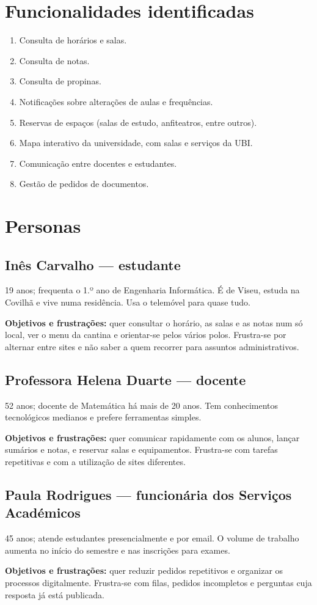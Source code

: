 \documentclass[12pt,a4paper]{article}
\begin{document}
\section{Funcionalidades identificadas}
\begin{enumerate}
\item Consulta de horários e salas.
\item Consulta de notas.
\item Consulta de propinas.
\item Notificações sobre alterações de aulas e frequências.
\item Reservas de espaços (salas de estudo, anfiteatros, entre outros).
\item Mapa interativo da universidade, com salas e serviços da UBI.
\item Comunicação entre docentes e estudantes.
\item Gestão de pedidos de documentos.
\end{enumerate}
\section{Personas}
\subsection{Inês Carvalho --- estudante}
19 anos; frequenta o 1.º ano de Engenharia Informática. É de Viseu, estuda na Covilhã e vive numa residência. Usa o telemóvel para quase tudo.\par
\textbf{Objetivos e frustrações:} quer consultar o horário, as salas e as notas num só local, ver o menu da cantina e orientar-se pelos vários polos. Frustra-se por alternar entre sites e não saber a quem recorrer para assuntos administrativos.
\subsection{Professora Helena Duarte --- docente}
52 anos; docente de Matemática há mais de 20 anos. Tem conhecimentos tecnológicos medianos e prefere ferramentas simples.\par
\textbf{Objetivos e frustrações:} quer comunicar rapidamente com os alunos, lançar sumários e notas, e reservar salas e equipamentos. Frustra-se com tarefas repetitivas e com a utilização de sites diferentes.
\subsection{Paula Rodrigues --- funcionária dos Serviços Académicos}
45 anos; atende estudantes presencialmente e por email. O volume de trabalho aumenta no início do semestre e nas inscrições para exames.\par
\textbf{Objetivos e frustrações:} quer reduzir pedidos repetitivos e organizar os processos digitalmente. Frustra-se com filas, pedidos incompletos e perguntas cuja resposta já está publicada.
\end{document}
